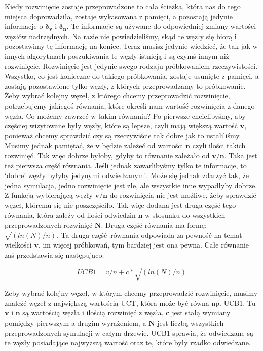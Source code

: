 Kiedy rozwinięcie zostaje przeprowadzone to cała ścieżka, która nas do tego miejsca doprowadziła, zostaje wykasowana z pamięci, a pozostają jedynie informacje o $\boldsymbol{\delta_v}$ i $\boldsymbol{\delta_n}$. Te informacje są używane do odpowiedniej zmiany wartości węzłów nadrzędnych. Na razie nie powiedzieliśmy, skąd te węzły się biorą i pozostawimy tę informację na koniec. Teraz musisz jedynie wiedzieć, że tak jak w innych algorytmach poszukiwania te węzły istnieją i są czymś innym niż rozwinięcie. Rozwinięcie jest jedynie swego rodzaju próbkowaniem rzeczywistości. Wszystko, co jest konieczne do takiego próbkowania, zostaje usunięte z pamięci, a zostają pozostawione tylko węzły, z których przeprowadzamy to próbkowanie. Żeby wybrać kolejny węzeł, z którego chcemy przeprowadzić rozwinięcie, potrzebujemy jakiegoś równania, które określi nam wartość rozwinięcia z danego węzła. Co możemy zawrzeć w takim równaniu? Po pierwsze chcielibyśmy, aby częściej wizytowane były węzły, które są lepsze, czyli mają większą wartość $\boldsymbol{v}$, ponieważ chcemy sprawdzić czy są rzeczywiście tak dobre jak to ustaliliśmy. Musimy jednak pamiętać, że $\boldsymbol{v}$ będzie zależeć od wartości $\boldsymbol{n}$ czyli ilości takich rozwinięć. Tak więc dobrze byłoby, gdyby to równanie zależało od $\boldsymbol{v/n}$. Taka jest też pierwsza część równania. Jeśli jednak zawarlibyśmy tylko te informacje, to ‘dobre’ węzły byłyby jedynymi odwiedzanymi. Może się jednak zdarzyć tak, że jedna symulacja, jedno rozwinięcie jest złe, ale wszystkie inne wypadłyby dobrze. Z funkcją wybierającą węzły $\boldsymbol{v/n}$ do rozwinięcia nie jest możliwe, żeby sprawdzić węzeł, któremu się nie poszczęściło. Tak więc dodana jest druga część tego równania, która zależy od ilości odwiedzin $\boldsymbol{n}$ w stosunku do wszystkich przeprowadzonych rozwinięć $\boldsymbol{N}$. Druga część równania ma formę: $\sqrt{( ln(N) / n)}$. Ta druga część równania odpowiada za pewność na temat wielkości $\boldsymbol{v}$, im więcej próbkowań, tym bardziej jest ona pewna. Całe równanie zaś przedstawia się następująco:

\begin{equation}
 UCB1 = v/n + c * \sqrt{( ln(N) / n)}
\end{equation}

\noindent Żeby wybrać kolejny węzeł, w którym chcemy przeprowadzić rozwinięcie, musimy znaleźć węzeł z największą wartością UCT, która może być równa np. UCB1. Tu $\boldsymbol{v}$ i $\boldsymbol{n}$ są wartością węzła i ilością rozwinięć z węzła, $\boldsymbol{c}$ jest stałą wymiany pomiędzy pierwszym a drugim wyrażeniem, a $\boldsymbol{N}$ jest liczbą wszystkich przeprowadzonych symulacji w całym drzewie. UCB1 sprawia, że odwiedzane są te węzły posiadające najwyższą wartość oraz te, które były rzadko odwiedzane.\newline

